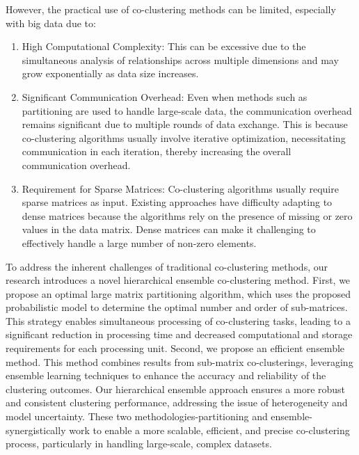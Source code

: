 However, the practical use of co-clustering methods can be limited, especially with big data due to:

\begin{enumerate}
    \item High Computational Complexity: This can be excessive due to the simultaneous analysis of relationships across multiple dimensions and may grow exponentially as data size increases.
    \item Significant Communication Overhead: Even when methods such as partitioning are used to handle large-scale data, the communication overhead remains significant due to multiple rounds of data exchange. This is because co-clustering algorithms usually involve iterative optimization, necessitating communication in each iteration, thereby increasing the overall communication overhead.
    \item Requirement for Sparse Matrices: Co-clustering algorithms usually require sparse matrices as input. Existing approaches have difficulty adapting to dense matrices because the algorithms rely on the presence of missing or zero values in the data matrix. Dense matrices can make it challenging to effectively handle a large number of non-zero elements.
\end{enumerate}

To address the inherent challenges of traditional co-clustering methods, our research introduces a novel hierarchical ensemble co-clustering method. First,  we propose an optimal large matrix partitioning algorithm, which uses the proposed probabilistic model to determine the optimal number and order of sub-matrices. This strategy enables simultaneous processing of co-clustering tasks, leading to a significant reduction in processing time and decreased computational and storage requirements for each processing unit.
Second, we propose an efficient ensemble method. This method combines results from sub-matrix co-clusterings, leveraging ensemble learning techniques to enhance the accuracy and reliability of the clustering outcomes. Our hierarchical ensemble approach ensures a more robust and consistent clustering performance, addressing the issue of heterogeneity and model uncertainty.
These two methodologies-partitioning and ensemble-synergistically work to enable a more scalable, efficient, and precise co-clustering process, particularly in handling large-scale, complex datasets.


